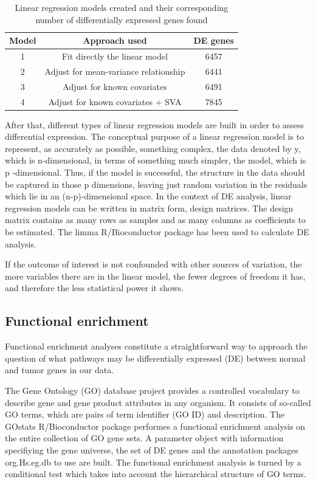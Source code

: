 \documentclass[9pt,twocolumn,twoside]{gsajnl}
\begin{document}
\begin{table} 
\centering
\caption{Linear regression models created and their corresponding number of differentially expressed genes found}
\begin{tableminipage}{\textwidth}
\begin{tabular}{c c c} 
\hline
Model & Approach used & DE genes \\ [0.5ex]
\hline
1 & Fit directly the linear model & 6457 \\
2 & Adjust for mean-variance relationship & 6441 \\
3 & Adjust for known covariates & 6491 \\
4 & Adjust for known covariates + SVA & 7845 \\
\hline
\end{tabular}
  \label{tab:model_go}
\end{tableminipage}
\end{table}

After that, different types of linear regression models are built in order to assess differential expression. The conceptual purpose of a linear regression model is to represent, as accurately as possible, something complex, the data denoted by y, which is n-dimensional, in terms of something much simpler, the model, which is p -dimensional. Thus, if the model is successful, the structure in the data should be captured in those p dimensions, leaving just random variation in the residuals which lie in an (n-p)-dimensional space. In the context of DE analysis, linear regression models can be written in matrix form, design matrices. The design matrix contains as many rows as samples and as many columns as coefficients to be estimated. The limma \citep{Ritchie2015} R/Bioconductor package has been used to calculate DE analysis.

If the outcome of interest is not confounded with other sources of variation, the more variables there are in the linear model, the fewer degrees of freedom it has, and therefore the less statistical power it shows.

\subsection*{Functional enrichment}

Functional enrichment analyses constitute a straightforward way to approach the question of what pathways may be differentially expressed (DE) between normal and tumor genes in our data.

The Gene Ontology (GO) database project provides a controlled vocabulary to describe gene and gene product attributes in any organism. It consists of so-called GO terms, which are pairs of term identifier (GO ID) and description. The GOstats \citep{Falcon2007} R/Bioconductor package performes a functional enrichment analysis on the entire collection of GO gene sets. A parameter object with information specifiying the gene universe, the set of DE genes and the annotation packages org.Hs.eg.db \citep{org.Hs.eg.db} to use are built. The functional enrichment analysis is turned by a conditional test which takes into account the hierarchical structure of GO terms.
\end{document}
